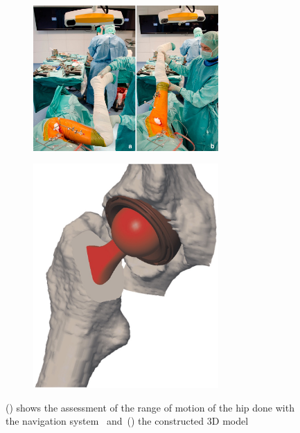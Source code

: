 \documentclass[whitelogo]{tudelft-report}
\begin{document}
{\begin{figure}[ht]
	\centering
	\begin{subfigure}[b]{0.5\linewidth}
	    \centering\includegraphics[width=200pt]{rangeofmotionmeasurementusingnavigationsystem.jpg}
	    \caption{\label{fig:fig1}}
	\end{subfigure}%
	\begin{subfigure}[b]{0.5\linewidth}
		\centering\includegraphics[width=200pt]{computer_navigation_system2.jpg}
		\caption{\label{fig:fig2}}
	\end{subfigure}
	\caption{() shows the assessment of the range of motion of the hip done with the navigation system~\cite{woerner2016visual} and~() the constructed 3D model~\cite{renkawitz2012development}}
\end{figure}

	
}
\end{document}
